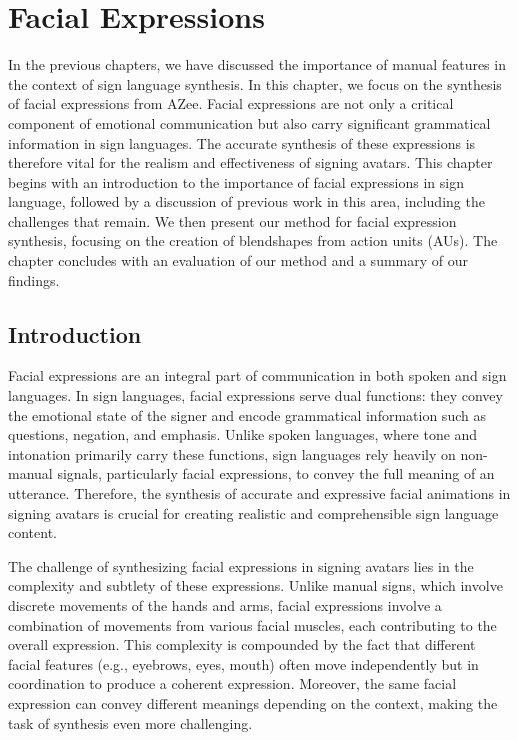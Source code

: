 \documentclass[../../main.tex]{subfiles}
\begin{document}
\chapter{Facial Expressions}
\label{ch:facial_expressions}

In the previous chapters, we have discussed the importance of manual features in the context of sign language synthesis. In this chapter, we focus on the synthesis of facial expressions from AZee. Facial expressions are not only a critical component of emotional communication but also carry significant grammatical information in sign languages. The accurate synthesis of these expressions is therefore vital for the realism and effectiveness of signing avatars. This chapter begins with an introduction to the importance of facial expressions in sign language, followed by a discussion of previous work in this area, including the challenges that remain. We then present our method for facial expression synthesis, focusing on the creation of blendshapes from action units (AUs). The chapter concludes with an evaluation of our method and a summary of our findings.

\section{Introduction}

Facial expressions are an integral part of communication in both spoken and sign languages. In sign languages, facial expressions serve dual functions: they convey the emotional state of the signer and encode grammatical information such as questions, negation, and emphasis. Unlike spoken languages, where tone and intonation primarily carry these functions, sign languages rely heavily on non-manual signals, particularly facial expressions, to convey the full meaning of an utterance. Therefore, the synthesis of accurate and expressive facial animations in signing avatars is crucial for creating realistic and comprehensible sign language content.

The challenge of synthesizing facial expressions in signing avatars lies in the complexity and subtlety of these expressions. Unlike manual signs, which involve discrete movements of the hands and arms, facial expressions involve a combination of movements from various facial muscles, each contributing to the overall expression. This complexity is compounded by the fact that different facial features (e.g., eyebrows, eyes, mouth) often move independently but in coordination to produce a coherent expression. Moreover, the same facial expression can convey different meanings depending on the context, making the task of synthesis even more challenging.
\end{document}
